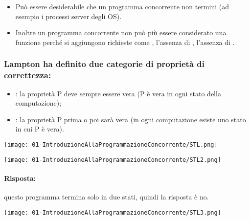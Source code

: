 \begin{itemize}
  \item Può essere desiderabile che un programma concorrente non termini (ad esempio i processi server degli OS).
  \item Inoltre un programma concorrente non può più essere considerato una funzione perché si aggiungono richieste come , l'assenza di , l'assenza di .
\end{itemize}


\subsubsection{Lampton ha definito due categorie di proprietà di correttezza:}
\begin{itemize}
  \item {}: la proprietà P deve sempre essere vera (P è vera in ogni stato della computazione);
  \item {}: la proprietà P prima o poi sarà vera (in ogni computazione esiste uno stato in cui P è vera).
\end{itemize}



\begin{center}
    \texttt{[image: 01-IntroduzioneAllaProgrammazioneConcorrente/STL.png]}
\end{center}


\begin{center}
    \texttt{[image: 01-IntroduzioneAllaProgrammazioneConcorrente/STL2.png]}
\end{center}

\paragraph{Risposta:} questo programma termina solo in due stati, quindi la risposta è no.



\begin{center}
    \texttt{[image: 01-IntroduzioneAllaProgrammazioneConcorrente/STL3.png]}
\end{center}

